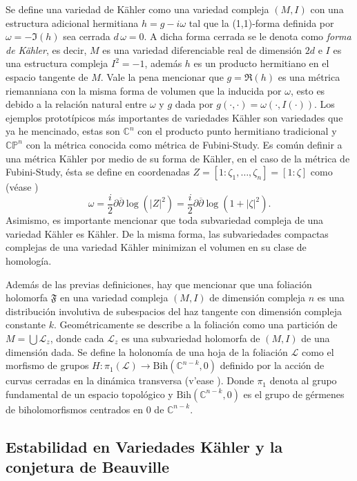 \documentclass{article}
\newcommand{\co}{\ensuremath{\mathbb C }}
\newcommand{\con}{\ensuremath{\mathbb{C}^n}}
\newcommand{\cp}{\ensuremath{\mathbb{CP}}}
\begin{document}
Se define una variedad de K\"ahler como una variedad compleja $(M,I)$ con una estructura adicional hermitiana $h=g-i\omega$ tal que la (1,1)-forma definida por $\omega=-\Im (h)$ sea cerrada $d\,\omega=0$. A dicha forma cerrada se le denota como \emph{forma de K\"ahler}, es decir, $M$ es una variedad diferenciable real de dimensi\'on $2d$ e
$I$ es una estructura compleja $I^2=-1$, adem\'as $h$ es un producto hermitiano en el espacio tangente de $M$.
Vale la pena mencionar que $g=\Re (h)$ es una m\'etrica riemanniana con la misma forma de volumen que la inducida por $\omega$, esto es debido a la relaci\'on natural entre $\omega$ y $g$ dada por $g(\cdot,\cdot)=\omega(\cdot,I(\cdot))$. Los ejemplos protot\'ipicos m\'as importantes de variedades K\"ahler son variedades que ya he mencinado, estas son $\con$ con el producto punto hermitiano tradicional y $\cp^{n}$ con la m\'etrica conocida como m\'etrica de Fubini-Study.
Es com\'un definir a una m\'etrica K\"ahler por medio de su forma de K\"ahler, en el caso de la m\'etrica de Fubini-Study, \'esta se define en coordenadas $Z=[1:\zeta_{1},\dots,\zeta_{n}]=[1:\zeta]$ como (v\'ease \cite[p. 154]{Chirka})
\[
    \omega=\frac{i}{2}\partial\overline{\partial}\log(|Z|^{2})=\frac{i}{2}\partial\overline{\partial}\log(1+|\zeta|^{2}).
\]
Asimismo, es importante mencionar que toda subvariedad compleja de una variedad K\"ahler es K\"ahler. De la misma forma, las subvariedades compactas complejas de una variedad K\"ahler minimizan el volumen en su clase de homolog\'ia.

Adem\'as de las previas definiciones, hay que mencionar que una foliaci\'on holomorfa $\mathfrak{F}$ en una variedad compleja $(M,I)$ de dimensi\'on compleja
$n$ es una distribuci\'on involutiva de subespacios del haz tangente con dimensi\'on compleja constante $k$. Geom\'etricamente se describe a la foliaci\'on como
una partici\'on de $M=\bigcup\mathcal{L}_z$, donde cada $\mathcal{L}_z$ es una subvariedad holomorfa de $(M,I)$ de una dimensi\'on dada. Se define la
holonom\'ia de una hoja de la foliaci\'on $\mathcal{L}$ como el morfismo de grupos $H:\pi_{1}(\mathcal{L})\rightarrow\textrm{Bih}(\co^{n-k},0)$ definido por la
acci\'on de curvas cerradas en la din\'amica transversa (v'ease \cite{Thurston}). Donde $\pi_{1}$ denota al grupo fundamental de un espacio topol\'ogico y
    $\textrm{Bih}(\co^{n-k},0)$ es el grupo de g\'ermenes de biholomorfismos centrados en $0$ de $\co^{n-k}$.

\subsection{Estabilidad en Variedades K\"ahler y la conjetura de Beauville}
\end{document}
